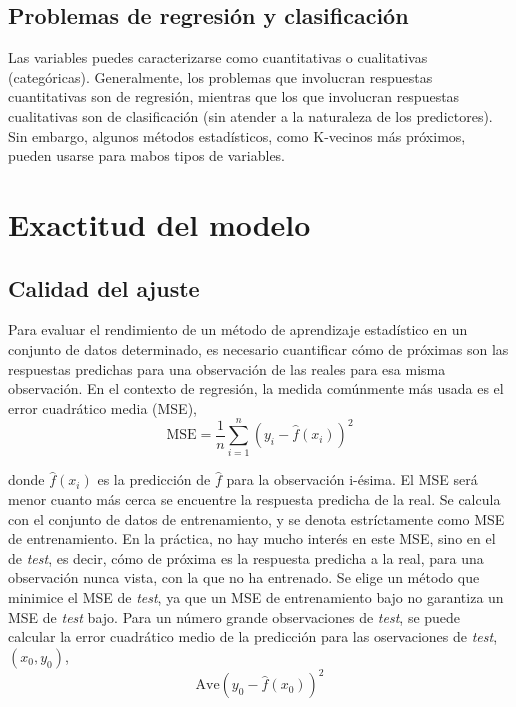 \subsection{Problemas de regresión y clasificación}

Las variables puedes caracterizarse como cuantitativas o cualitativas (categóricas). Generalmente, los problemas que involucran respuestas cuantitativas son de regresión, mientras que los que involucran respuestas cualitativas son de clasificación (sin atender a la naturaleza de los predictores). Sin embargo, algunos métodos estadísticos, como K-vecinos más próximos, pueden usarse para mabos tipos de variables. 

\section{Exactitud del modelo}

\subsection{Calidad del ajuste}

Para evaluar el rendimiento de un método de aprendizaje estadístico en un conjunto de datos determinado, es necesario cuantificar cómo de próximas son las respuestas predichas para una observación de las reales para esa misma observación. En el contexto de regresión, la medida comúnmente más usada es el error cuadrático media (MSE), 
\begin{equation}
\text{MSE} = \frac{1}{n} \sum_{i=1}^n (y_i - \hat{f}(x_i))^2
\end{equation}

\noindent donde $\hat{f}(x_i)$ es la predicción de $\hat{f}$ para la observación i-ésima. El MSE será menor cuanto más cerca se encuentre la respuesta predicha de la real. Se calcula con el conjunto de datos de entrenamiento, y se denota estríctamente como MSE de entrenamiento. En la práctica, no hay mucho interés en este MSE, sino en el de \textit{test}, es decir, cómo de próxima es la respuesta predicha a la real, para una observación nunca vista, con la que no ha entrenado. Se elige un método que minimice el MSE de \textit{test}, ya que un MSE de entrenamiento bajo no garantiza un MSE de \textit{test} bajo. Para un número grande observaciones de \textit{test}, se puede calcular la error cuadrático medio de la predicción para las oservaciones de \textit{test}, $(x_0, y_0)$, 
\begin{equation}
\text{Ave}(y_0 - \hat{f}(x_0))^2
\end{equation}

